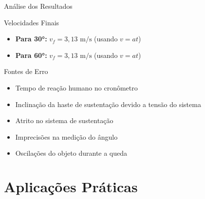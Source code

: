 \documentclass[12pt]{beamer}
\begin{document}
\begin{frame}{Análise dos Resultados}

    \begin{block}{Velocidades Finais}
        \begin{itemize}
            \item \textbf{Para 30°:} $v_f = 3,13 \text{ m/s}$ (usando $v = at$)
            \item \textbf{Para 60°:} $v_f = 3,13 \text{ m/s}$ (usando $v = at$)
        \end{itemize}
    \end{block}

    \begin{block}{Fontes de Erro}
        \begin{itemize}
            \item Tempo de reação humano no cronômetro
            \item Inclinação da haste de sustentação devido a tensão do sistema
            \item Atrito no sistema de sustentação
            \item Imprecisões na medição do ângulo
            \item Oscilações do objeto durante a queda
        \end{itemize}
    \end{block}
\end{frame}

\section{Aplicações Práticas}
\end{document}
